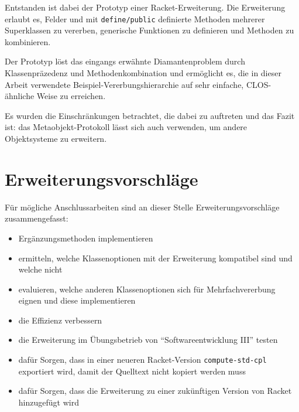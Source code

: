 Entstanden ist dabei der Prototyp einer Racket-Erweiterung. Die Erweiterung erlaubt es, Felder und mit \texttt{define/public} definierte Methoden mehrerer Superklassen zu vererben, generische Funktionen zu definieren und Methoden zu kombinieren.

Der Prototyp löst das eingangs erwähnte Diamantenproblem durch Klassenpräzedenz und Methodenkombination und ermöglicht es, die in dieser Arbeit verwendete Beispiel-Vererbungshierarchie auf sehr einfache, CLOS-ähnliche Weise zu erreichen.

Es wurden die Einschränkungen betrachtet, die dabei zu auftreten und das Fazit ist: das Metaobjekt-Protokoll lässt sich auch verwenden, um andere Objektsysteme zu erweitern.

\section{Erweiterungsvorschläge}

Für mögliche Anschlussarbeiten sind an dieser Stelle Erweiterungsvorschläge zusammengefasst:
\begin{itemize}
 \item Ergänzungsmethoden implementieren
 \item ermitteln, welche Klassenoptionen mit der Erweiterung kompatibel sind und welche nicht
 \item evaluieren, welche anderen Klassenoptionen sich für Mehrfachvererbung eignen und diese implementieren
 \item die Effizienz verbessern
 \item die Erweiterung im Übungsbetrieb von ``Softwareentwicklung III'' testen
 \item dafür Sorgen, dass in einer neueren Racket-Version \texttt{compute-std-cpl} exportiert wird, damit der Quelltext nicht kopiert werden muss
 \item dafür Sorgen, dass die Erweiterung zu einer zukünftigen Version von Racket hinzugefügt wird 
\end{itemize}

\cleardoublepage
{}
{}

  
\cleardoublepage


\cleardoublepage




